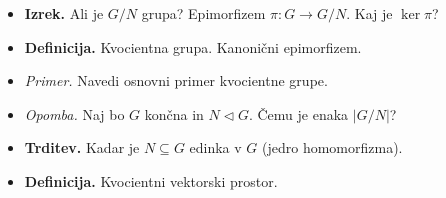 \begin{enumerate}
\begin{itemize}
        \item \colorbox{blue!30}{\textbf{Izrek.}} Ali je $G/N$ grupa? Epimorfizem $\pi: G \to G/N$. Kaj je $\ker \pi$?
        \item \colorbox{purple!30}{\textbf{Definicija.}} Kvocientna grupa. Kanonični epimorfizem.
        \item \colorbox{yellow!30}{\emph{Primer.}} Navedi osnovni primer kvocientne grupe.
        \item \colorbox{yellow!30}{\emph{Opomba.}} Naj bo $G$ končna in $N \lhd G$. Čemu je enaka $|G/N|$?
        \item \colorbox{blue!30}{\textbf{Trditev.}} Kadar je $N \subseteq G$ edinka v $G$ (jedro homomorfizma).
        \item \colorbox{purple!30}{\textbf{Definicija.}} Kvocientni vektorski prostor.
    \end{itemize}


\end{enumerate}
